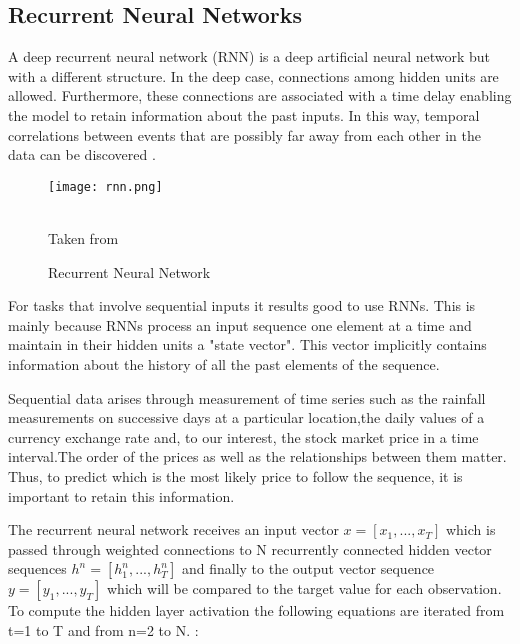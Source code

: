 \subsection{Recurrent Neural Networks}

A deep recurrent neural network (RNN) is a deep artificial neural network but with a different structure. In the deep case, connections among hidden units are allowed. Furthermore, these connections are associated with a time delay enabling the model to retain information about the past inputs. In this way, temporal correlations between events that are possibly far away from each other in the data can be discovered \cite{pascanu2013difficulty}.

\begin{figure}
\center
\texttt{[image: rnn.png]}
\caption{Recurrent Neural Network}
\label{fig:r_nn}
\begin{minipage}{12cm}
    \footnotesize
    \center
    \emph \\ Taken from \cite{lecun2015deep}
    \end{minipage}
\end{figure}
For tasks that involve sequential inputs it results good to use RNNs. This is mainly because RNNs process an input sequence one element at a time and maintain in their hidden units a "state vector". This vector implicitly contains information about the history of all the past elements of the sequence.\cite{lecun2015deep} 

Sequential data arises through measurement of time series such as the rainfall measurements on successive days at a particular location,the daily values of a currency exchange rate and, to our interest, the stock market price in a time interval.The order of the prices as well as the relationships between them matter. Thus, to predict which is the most likely price to follow the sequence, it is important to retain this information.

The recurrent neural network receives an input vector $x=[x_1,...,x_T]$ which is passed through weighted connections to N recurrently connected hidden vector sequences $h^n=[h_1^n,...,h_T^n]$ and finally to the output vector sequence $y=[y_1,...,y_T]$ which will be compared to the target value for each observation. To compute the hidden layer activation the following equations are iterated from t=1 to T and from n=2 to N. \cite{graves2013generating}:

